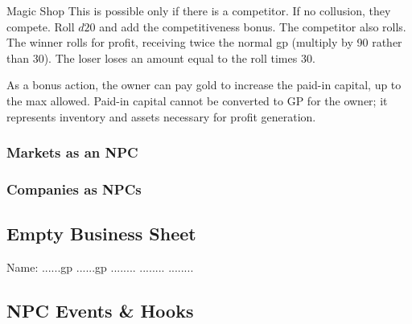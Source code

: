 \documentclass[twocolumn]{dndbook}
\begin{document}
\begin{DndMonster}[width=.5\textwidth - 8pt]{Magic Shop}
	This is possible only if there is a competitor. If no collusion, they compete.
	Roll $d20$ and add the competitiveness bonus.
	The competitor also rolls.
	The winner rolls for profit, receiving twice the normal gp (multiply by 90 rather than 30).
	The loser loses an amount equal to the roll times 30.

	As a bonus action, the owner can pay gold to increase
	the paid-in capital, up to the max allowed.
	Paid-in capital cannot be converted to GP for the owner; it represents inventory and assets necessary for profit generation.
\end{DndMonster}





\subsubsection{Markets as an NPC}



\subsubsection{Companies as NPCs}


\subsection{Empty Business Sheet}

\begin{DndMonster}[width=.5\textwidth - 8pt]{Name:}
	\hfill ......gp
	\hfill ......gp
	\hfill ........
	\hfill ........
	\hfill ........


\end{DndMonster}


\subsection{NPC Events \& Hooks}
\end{document}
